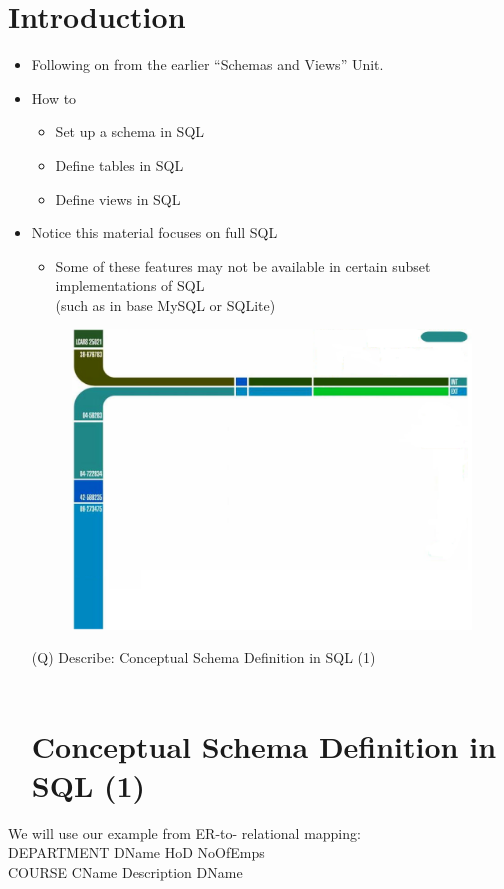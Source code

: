 \documentclass[12pt]{article}
\begin{document}
\section{Introduction}
\begin{itemize}
  \item Following on from the earlier “Schemas and 
Views” Unit.\\
  \item How to
\begin{itemize}
  \item Set up a schema in SQL
  \item Define tables in SQL
  \item Define views in SQL
\end{itemize}
  \item Notice this material focuses on full SQL
\begin{itemize}
  \item Some of these features may not be available in 
certain subset implementations of SQL\\
(such as in base MySQL or SQLite)\\
\end{itemize}
\begin{figure}[H]
\includegraphics[width=0.5\linewidth]{page4-image-1.png}
\end{figure}
\clearpage
(Q)
Describe: Conceptual Schema Definition in SQL (1)
\\ 
 \\
\section{Conceptual Schema Definition in SQL (1)}
\end{itemize}
  \item We will use our example from ER-to-
relational mapping:\\
DEPARTMENT DName HoD NoOfEmps\\
COURSE CName Description DName\\
\end{document}
